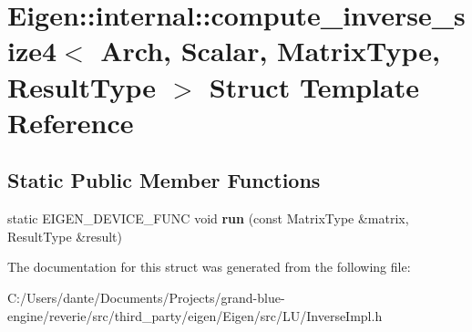 \hypertarget{struct_eigen_1_1internal_1_1compute__inverse__size4}{}\section{Eigen\+::internal\+::compute\+\_\+inverse\+\_\+size4$<$ Arch, Scalar, Matrix\+Type, Result\+Type $>$ Struct Template Reference}
\label{struct_eigen_1_1internal_1_1compute__inverse__size4}
\subsection*{Static Public Member Functions}
\begin{DoxyCompactItemize}
\item 
\mbox{\label{struct_eigen_1_1internal_1_1compute__inverse__size4_a469e6f0a3d8fcc11aeeed9df5add3843}} 
static E\+I\+G\+E\+N\+\_\+\+D\+E\+V\+I\+C\+E\+\_\+\+F\+U\+NC void {\bfseries run} (const Matrix\+Type \&matrix, Result\+Type \&result)
\end{DoxyCompactItemize}


The documentation for this struct was generated from the following file\+:\begin{DoxyCompactItemize}
\item 
C\+:/\+Users/dante/\+Documents/\+Projects/grand-\/blue-\/engine/reverie/src/third\+\_\+party/eigen/\+Eigen/src/\+L\+U/Inverse\+Impl.\+h\end{DoxyCompactItemize}
